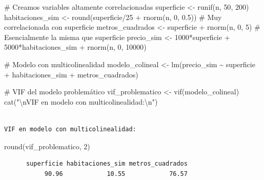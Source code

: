 \documentclass[
  letterpaper,
  DIV=11,
  numbers=noendperiod]{scrreprt}
\newenvironment{Shaded}{\begin{snugshade}}{\end{snugshade}}
\newcommand{\CommentTok}[1]{\textcolor[rgb]{0.37,0.37,0.37}{#1}}
\newcommand{\DecValTok}[1]{\textcolor[rgb]{0.68,0.00,0.00}{#1}}
\newcommand{\FloatTok}[1]{\textcolor[rgb]{0.68,0.00,0.00}{#1}}
\newcommand{\FunctionTok}[1]{\textcolor[rgb]{0.28,0.35,0.67}{#1}}
\newcommand{\NormalTok}[1]{\textcolor[rgb]{0.00,0.23,0.31}{#1}}
\newcommand{\OtherTok}[1]{\textcolor[rgb]{0.00,0.23,0.31}{#1}}
\newcommand{\SpecialCharTok}[1]{\textcolor[rgb]{0.37,0.37,0.37}{#1}}
\newcommand{\StringTok}[1]{\textcolor[rgb]{0.13,0.47,0.30}{#1}}
\begin{document}
\begin{tcolorbox}
\begin{Shaded}
\begin{Highlighting}[]
\CommentTok{\# Creamos variables altamente correlacionadas}
\NormalTok{superficie }\OtherTok{\textless{}{-}} \FunctionTok{runif}\NormalTok{(n, }\DecValTok{50}\NormalTok{, }\DecValTok{200}\NormalTok{)}
\NormalTok{habitaciones\_sim }\OtherTok{\textless{}{-}} \FunctionTok{round}\NormalTok{(superficie}\SpecialCharTok{/}\DecValTok{25} \SpecialCharTok{+} \FunctionTok{rnorm}\NormalTok{(n, }\DecValTok{0}\NormalTok{, }\FloatTok{0.5}\NormalTok{))  }\CommentTok{\# Muy correlacionada con superficie}
\NormalTok{metros\_cuadrados }\OtherTok{\textless{}{-}}\NormalTok{ superficie }\SpecialCharTok{+} \FunctionTok{rnorm}\NormalTok{(n, }\DecValTok{0}\NormalTok{, }\DecValTok{5}\NormalTok{)  }\CommentTok{\# Esencialmente la misma que superficie}
\NormalTok{precio\_sim }\OtherTok{\textless{}{-}} \DecValTok{1000}\SpecialCharTok{*}\NormalTok{superficie }\SpecialCharTok{+} \DecValTok{5000}\SpecialCharTok{*}\NormalTok{habitaciones\_sim }\SpecialCharTok{+} \FunctionTok{rnorm}\NormalTok{(n, }\DecValTok{0}\NormalTok{, }\DecValTok{10000}\NormalTok{)}

\CommentTok{\# Modelo con multicolinealidad}
\NormalTok{modelo\_colineal }\OtherTok{\textless{}{-}} \FunctionTok{lm}\NormalTok{(precio\_sim }\SpecialCharTok{\textasciitilde{}}\NormalTok{ superficie }\SpecialCharTok{+}\NormalTok{ habitaciones\_sim }\SpecialCharTok{+}\NormalTok{ metros\_cuadrados)}

\CommentTok{\# VIF del modelo problemático}
\NormalTok{vif\_problematico }\OtherTok{\textless{}{-}} \FunctionTok{vif}\NormalTok{(modelo\_colineal)}
\FunctionTok{cat}\NormalTok{(}\StringTok{"}\SpecialCharTok{\textbackslash{}n}\StringTok{VIF en modelo con multicolinealidad:}\SpecialCharTok{\textbackslash{}n}\StringTok{"}\NormalTok{)}
\end{Highlighting}
\end{Shaded}

\begin{verbatim}

VIF en modelo con multicolinealidad:
\end{verbatim}

\begin{Shaded}
\begin{Highlighting}[]
\FunctionTok{round}\NormalTok{(vif\_problematico, }\DecValTok{2}\NormalTok{)}
\end{Highlighting}
\end{Shaded}

\begin{verbatim}
      superficie habitaciones_sim metros_cuadrados 
           90.96            10.55            76.57 
\end{verbatim}


\end{tcolorbox}
\end{document}

